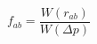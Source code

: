 \documentclass[12pt]{article}
\begin{document}
$$
  f_{ab} = \frac{W\left(r_{ab} \right)}{W\left( \Delta p \right)}
$$  
\end{document}

